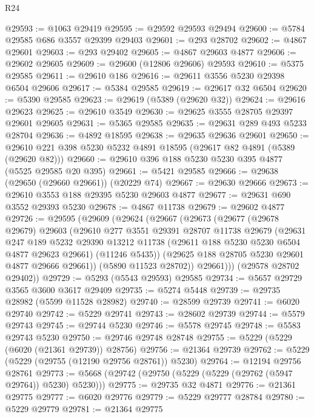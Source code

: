 \begin{lexlean}{R24}
\begin{coremodule}
@29593 := @1063 @29419
@29595 := @29592 @29593 @29494
@29600 := @5784 @29585 @686 @3557 @29399 @29403
@29601 := @293 @28702
@29602 := @4867 @29601
@29603 := @293 @29402
@29605 := @4867 @29603 @4877
@29606 := @29602 @29605
@29609 := @29600 (@12806 @29606) @29593
@29610 := @5375 @29585
@29611 := @29610 @186
@29616 := @29611 @3556 @5230 @29398 @6504 @29606
@29617 := @5384 @29585
@29619 := @29617 @32 @6504
@29620 := @5390 @29585
@29623 := @29619 (@5389 (@29620 @32))
@29624 := @29616 @29623
@29625 := @29610 @3549
@29630 := @29625 @3555 @28705 @29397 @29601 @29605
@29631 := @5365 @29585
@29635 := @29631 @289 @493 @5233 @28704
@29636 := @4892 @18595
@29638 := @29635 @29636 @29601
@29650 := @29610 @221 @398 @5230 @5232 @4891 @18595 (@29617 @82 @4891 (@5389 (@29620 @82)))
@29660 := @29610 @396 @188 @5230 @5230 @395 @4877 (@5525 @29585 @20 @395)
@29661 := @5421 @29585
@29666 := @29638 (@29650 (@29660 @29661)) (@20229 @74)
@29667 := @29630 @29666
@29673 := @29610 @3553 @188 @29395 @5230 @29603 @4877
@29677 := @29631 @690 @3552 @29393 @5230
@29678 := @4867 @11738
@29679 := @29602 @4877
@29726 := @29595
    (@29609
      (@29624
        (@29667
          (@29673
            (@29677
              (@29678 @29679)
              @29603
              (@29610
                @277
                @3551
                @29391
                @28707
                @11738
                @29679
                (@29631
                  @247
                  @189
                  @5232
                  @29390
                  @13212
                  @11738
                  (@29611 @188 @5230 @5230 @6504 @4877 @29623 @29661)
                  (@11246 @5435))
                (@29625 @188 @28705 @5230 @29601 @4877 @29666 @29661))
              (@5890 @11523 @28702))
            @29661)))
      (@29578 @28702 @29402))
@29729 := @5293 (@5543 @29593) @29585
@29734 := @5657 @29729 @3565 @3600 @3617 @29409
@29735 := @5274 @5448
@29739 := @29735 @28982 (@5599 @11528 @28982)
@29740 := @28599 @29739
@29741 := @6020 @29740
@29742 := @5229 @29741
@29743 := @28602 @29739
@29744 := @5579 @29743
@29745 := @29744 @5230
@29746 := @5578 @29745
@29748 := @5583 @29743 @5230
@29750 := @29746 @29748 @28748
@29755 := @5229 (@5229 (@6020 (@21361 @29739)) @28756)
@29756 := @21364 @29739
@29762 := @5229 (@5229 (@29755 (@12190 @29756 @28761)) @5230)
@29764 := @12194 @29756 @28761
@29773 := @5668 (@29742 (@29750 (@5229 (@5229 (@29762 (@5947 @29764)) @5230) @5230)))
@29775 := @29735 @32 @4871
@29776 := @21361 @29775
@29777 := @6020 @29776
@29779 := @5229 @29777 @28784
@29780 := @5229 @29779
@29781 := @21364 @29775

\end{coremodule}
\end{lexlean}
